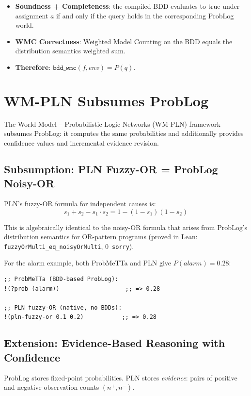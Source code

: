 \documentclass[11pt,a4paper]{article}
\theoremstyle{definition}
\begin{document}
\begin{itemize}
\item \textbf{Soundness + Completeness}: the compiled BDD evaluates to true
  under assignment $a$ if and only if the query holds in the corresponding
  ProbLog world.
\item \textbf{WMC Correctness}: Weighted Model Counting on the BDD equals
  the distribution semantics weighted sum.
\item \textbf{Therefore}: $\texttt{bdd\_wmc}(f, \mathit{env}) = P(q)$.
\end{itemize}

\section{WM-PLN Subsumes ProbLog}

The World Model -- Probabilistic Logic Networks (WM-PLN) framework
subsumes ProbLog: it computes the same probabilities and additionally
provides confidence values and incremental evidence revision.

\subsection{Subsumption: PLN Fuzzy-OR = ProbLog Noisy-OR}

PLN's fuzzy-OR formula for independent causes is:
\[
s_1 + s_2 - s_1 \cdot s_2 = 1 - (1-s_1)(1-s_2)
\]

This is algebraically identical to the noisy-OR formula that arises from
ProbLog's distribution semantics for OR-pattern programs (proved in Lean:
\texttt{fuzzyOrMulti\_eq\_noisyOrMulti}, 0~\texttt{sorry}).

For the alarm example, both ProbMeTTa and PLN give $P(\mathit{alarm}) = 0.28$:

\begin{lstlisting}[language=MeTTa]
;; ProbMeTTa (BDD-based ProbLog):
!(?prob (alarm))                   ;; => 0.28

;; PLN fuzzy-OR (native, no BDDs):
!(pln-fuzzy-or 0.1 0.2)           ;; => 0.28
\end{lstlisting}

\subsection{Extension: Evidence-Based Reasoning with Confidence}

ProbLog stores fixed-point probabilities. PLN stores \emph{evidence}:
pairs of positive and negative observation counts $(n^+, n^-)$.
\end{document}
